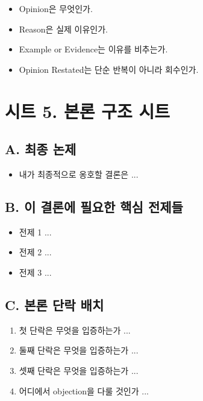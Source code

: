 \begin{itemize}
\tightlist
\item
  Opinion은 무엇인가.
\item
  Reason은 실제 이유인가.
\item
  Example or Evidence는 이유를 비추는가.
\item
  Opinion Restated는 단순 반복이 아니라 회수인가.
\end{itemize}

\section{시트 5. 본론 구조 시트}\label{uxc2dcuxd2b8-5-uxbcf8uxb860-uxad6cuxc870-uxc2dcuxd2b8}

\subsection{A. 최종 논제}\label{a-uxcd5cuxc885-uxb17cuxc81c}

\begin{itemize}
\tightlist
\item
  내가 최종적으로 옹호할 결론은 ...
\end{itemize}

\subsection{B. 이 결론에 필요한 핵심 전제들}\label{b-uxc774-uxacb0uxb860uxc5d0-uxd544uxc694uxd55c-uxd575uxc2ec-uxc804uxc81cuxb4e4}

\begin{itemize}
\tightlist
\item
  전제 1 ...
\item
  전제 2 ...
\item
  전제 3 ...
\end{itemize}

\subsection{C. 본론 단락 배치}\label{c-uxbcf8uxb860-uxb2e8uxb77d-uxbc30uxce58}

\begin{enumerate}
\def\labelenumi{\arabic{enumi}.}
\tightlist
\item
  첫 단락은 무엇을 입증하는가 ...
\item
  둘째 단락은 무엇을 입증하는가 ...
\item
  셋째 단락은 무엇을 입증하는가 ...
\item
  어디에서 objection을 다룰 것인가 ...
\end{enumerate}

